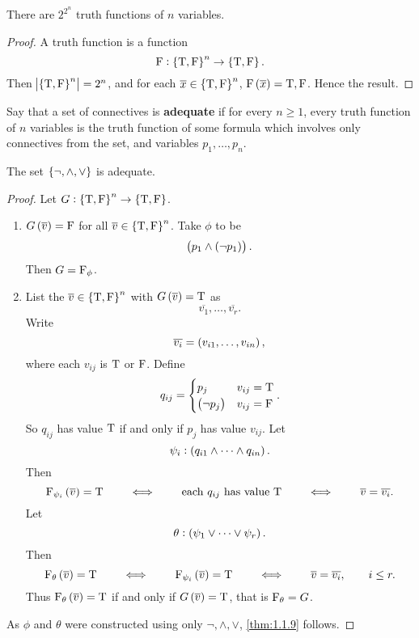 \begin{lemma}
There are $ 2^{2^n} $ truth functions of $ n $ variables.
\end{lemma}

\begin{proof}
A truth function is a function
$$ \F : \cbr{\T, \F}^n \to \cbr{\T, \F}. $$
Then $ \abs{\cbr{\T, \F}^n} = 2^n $, and for each $ \overline{x} \in \cbr{\T, \F}^n $, $ \F\br{\overline{x}} = \T, \F $. Hence the result.
\end{proof}

\begin{definition}
Say that a set of connectives is \textbf{adequate} if for every $ n \ge 1 $, every truth function of $ n $ variables is the truth function of some formula which involves only connectives from the set, and variables $ p_1, \dots, p_n $.
\end{definition}

\begin{theorem}
\label{thm:1.1.9}
The set $ \cbr{\neg, \land, \lor} $ is adequate.
\end{theorem}

\begin{proof}
Let $ G : \cbr{\T, \F}^n \to \cbr{\T, \F} $.
\begin{enumerate}[leftmargin=0.5in, label=Case \arabic*.]
\item $ G\br{\overline{v}} = \F $ for all $ \overline{v} \in \cbr{\T, \F}^n $. Take $ \phi $ to be
$$ \andb{p_1}{\notb{p_1}}. $$
Then $ G = \mathrm{F}_\phi $.

\pagebreak

\item List the $ \overline{v} \in \cbr{\T, \F}^n $ with $ G\br{\overline{v}} = \T $ as
$$ \overline{v_1}, \dots, \overline{v_r}. $$
Write
$$ \overline{v_i} = \br{v_{i1}, \dots, v_{in}}, $$
where each $ v_{ij} $ is $ \mathrm{T} $ or $ \mathrm{F} $. Define
$$ q_{ij} =
\begin{cases}
p_j & v_{ij} = \T \\
\notb{p_j} & v_{ij} = \F
\end{cases}.
$$
So $ q_{ij} $ has value $ \mathrm{T} $ if and only if $ p_j $ has value $ v_{ij} $. Let
$$ \psi_i : \br{q_{i1} \land \dots \land q_{in}}. $$
Then
$$ \F_{\psi_i}\br{\overline{v}} = \T \qquad \iff \qquad \text{each} \ q_{ij} \ \text{has value} \ \T \qquad \iff \qquad \overline{v} = \overline{v_i}. $$
Let
$$ \theta : \br{\psi_1 \lor \dots \lor \psi_r}. $$
Then
$$ \F_\theta\br{\overline{v}} = \T \qquad \iff \qquad \F_{\psi_i}\br{\overline{v}} = \T \qquad \iff \qquad \overline{v} = \overline{v_i}, \qquad i \le r. $$
Thus $ \F_\theta\br{\overline{v}} = \T $ if and only if $ G\br{\overline{v}} = \T $, that is $ \mathrm{F}_\theta = G $.
\end{enumerate}
As $ \phi $ and $ \theta $ were constructed using only $ \neg, \land, \lor $, \ref{thm:1.1.9} follows.
\end{proof}

